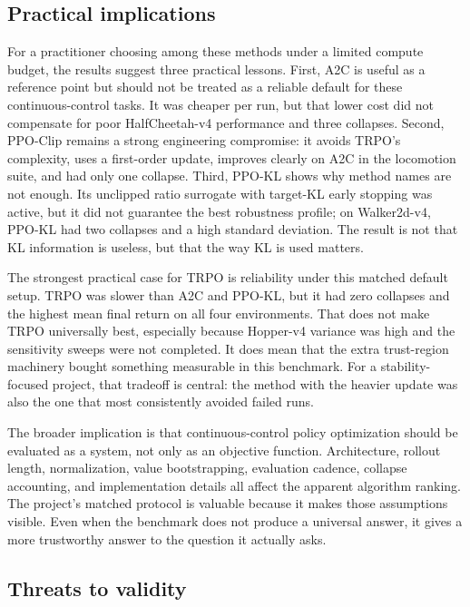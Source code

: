 \documentclass{article}
\begin{document}
\subsection{Practical implications}

For a practitioner choosing among these methods under a limited compute budget, the results suggest three practical lessons. First, A2C is useful as a reference point but should not be treated as a reliable default for these continuous-control tasks. It was cheaper per run, but that lower cost did not compensate for poor HalfCheetah-v4 performance and three collapses. Second, PPO-Clip remains a strong engineering compromise: it avoids TRPO's complexity, uses a first-order update, improves clearly on A2C in the locomotion suite, and had only one collapse. Third, PPO-KL shows why method names are not enough. Its unclipped ratio surrogate with target-KL early stopping was active, but it did not guarantee the best robustness profile; on Walker2d-v4, PPO-KL had two collapses and a high standard deviation. The result is not that KL information is useless, but that the way KL is used matters.

The strongest practical case for TRPO is reliability under this matched default setup. TRPO was slower than A2C and PPO-KL, but it had zero collapses and the highest mean final return on all four environments. That does not make TRPO universally best, especially because Hopper-v4 variance was high and the sensitivity sweeps were not completed. It does mean that the extra trust-region machinery bought something measurable in this benchmark. For a stability-focused project, that tradeoff is central: the method with the heavier update was also the one that most consistently avoided failed runs.

The broader implication is that continuous-control policy optimization should be evaluated as a system, not only as an objective function. Architecture, rollout length, normalization, value bootstrapping, evaluation cadence, collapse accounting, and implementation details all affect the apparent algorithm ranking. The project's matched protocol is valuable because it makes those assumptions visible. Even when the benchmark does not produce a universal answer, it gives a more trustworthy answer to the question it actually asks.

\subsection{Threats to validity}
\end{document}
